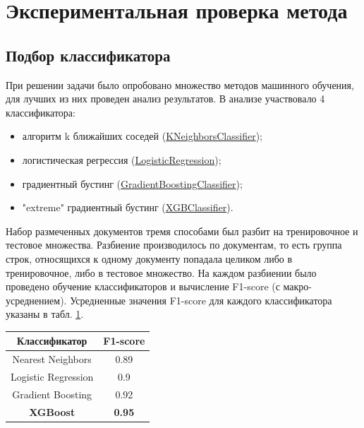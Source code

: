 \documentclass{ProcISPRAS}
\begin{document}
\section{Экспериментальная проверка метода}

\subsection{Подбор классификатора}

При решении задачи было опробовано множество методов машинного обучения, для лучших из них проведен анализ результатов. В анализе участвовало 4 классификатора:

\begin{itemize}

  \item алгоритм k ближайших соседей (\href{https://scikit-learn.org/stable/modules/generated/sklearn.neighbors.KNeighborsClassifier.html}{KNeighborsClassifier});
  \item логистическая регрессия (\href{https://scikit-learn.org/stable/modules/generated/sklearn.linear_model.LogisticRegression.html}{LogisticRegression});
  \item градиентный бустинг (\href{https://scikit-learn.org/stable/modules/generated/sklearn.ensemble.GradientBoostingClassifier.html}{GradientBoostingClassifier});
  \item "extreme" градиентный бустинг (\href{https://xgboost.readthedocs.io/en/latest/}{XGBClassifier}).

\end{itemize}

Набор размеченных документов тремя способами был разбит на тренировочное и тестовое множества. Разбиение производилось по документам, то есть группа строк, относящихся к одному документу попадала целиком либо в тренировочное, либо в тестовое множество. На каждом разбиении было проведено обучение классификаторов и вычисление F1-score (с макро-усреднением). Усредненные значения F1-score для каждого классификатора указаны в табл. \ref{tab:classifier_comparison}.
\begin{table}[ht]
\begin{tabular}{cc}
 \toprule
    \textbf{Классификатор} & \textbf{F1-score} \\
    \midrule
        Nearest Neighbors & 0.89 \\
        Logistic Regression & 0.9 \\
        Gradient Boosting & 0.92 \\
        \bf XGBoost & \bf 0.95 \\
    \bottomrule
    \end{tabular}
    \label{tab:classifier_comparison}
\end{table}
\end{document}
